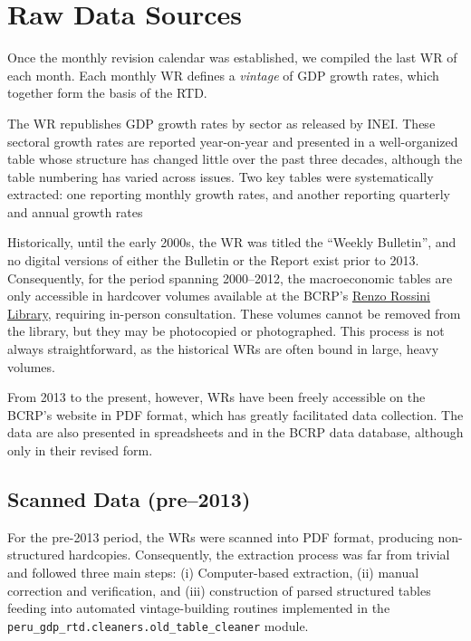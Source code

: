 \documentclass[a4paper, fleqn, 11pt]{article}
\newcommand{\pymodule}[1]{\texttt{#1}}
\begin{document}
\section{Raw Data Sources}
\label{section:raw_data}

Once the monthly revision calendar was established, we compiled the last WR of each month. Each monthly WR defines a \emph{vintage} of GDP growth rates, which together form the basis of the RTD.

The WR republishes GDP growth rates by sector as released by INEI. These sectoral growth rates are reported year-on-year and presented in a well-organized table whose structure has changed little over the past three decades, although the table numbering has varied across issues. Two key tables were systematically extracted: one reporting monthly growth rates, and another reporting quarterly and annual growth rates

Historically, until the early 2000s, the WR was titled the ``Weekly Bulletin'', and no digital versions of either the Bulletin or the Report exist prior to 2013. Consequently, for the period spanning 2000–2012, the macroeconomic tables are only accessible in hardcover volumes available at the BCRP's \href{https://biblioteca.bcrp.gob.pe/discovery/search?vid=51BCDRDP_INST:51BCDRDP2}{Renzo
 Rossini Library}, requiring in-person consultation. These volumes cannot be removed from the library, but they may be photocopied or photographed. This process is not always straightforward, as the historical WRs are often bound in large, heavy volumes.

From 2013 to the present, however, WRs have been freely accessible on the BCRP's website in PDF format, which has greatly facilitated data collection. The data are also presented in spreadsheets and in the BCRP data database, although only in their revised form.

\subsection{Scanned Data (pre–2013)}

For the pre-2013 period, the WRs  were scanned into PDF format, producing non-structured hardcopies. Consequently, the extraction process was far from trivial and followed three main steps: (i) Computer-based extraction, (ii) manual correction and verification, and (iii) construction of parsed structured tables feeding into automated vintage-building routines implemented in the \pymodule{peru\_gdp\_rtd.cleaners.old\_table\_cleaner} module.
\end{document}
